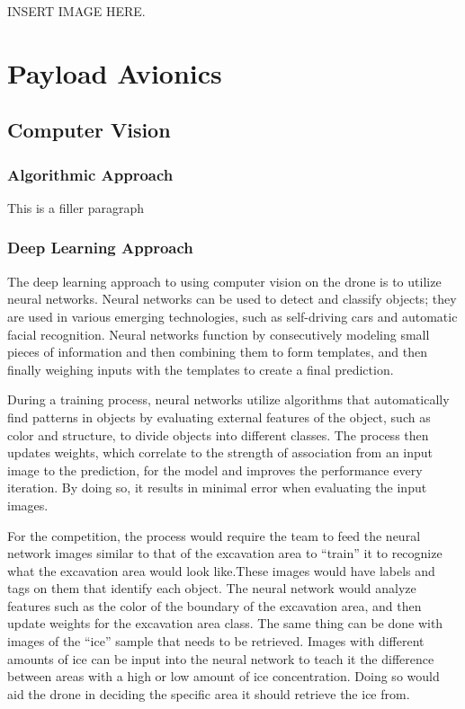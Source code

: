 			INSERT IMAGE HERE.

\section{Payload Avionics}\label{PL:Tradeoffs:Avionics}
	\subsection{Computer Vision}
		\subsubsection{Algorithmic Approach}
			This is a filler paragraph

		\subsubsection{Deep Learning Approach}
			The deep learning approach to using computer vision on the drone is to utilize neural networks. Neural networks can be used to detect and classify objects; they are used in various emerging technologies, such as self-driving cars and automatic facial recognition. 
			Neural networks function by consecutively modeling small pieces of information and then combining them to form templates, and then finally weighing inputs with the templates to create a final prediction.
		
			During a training process, neural networks utilize algorithms that automatically find patterns in objects by evaluating external features of the object, such as color and structure, to divide objects into different classes. The process then updates weights, which correlate to the strength of association from an input image to the prediction, for the model and improves the performance every iteration. By doing so, it results in minimal error when evaluating the input images.
		
			For the competition, the process would require the team to feed the neural network images similar to that of the excavation area to “train” it to recognize what the excavation area would look like.These images would have labels and tags on them that identify each object. The neural network would analyze features such as the color of the boundary of the excavation area, and then update weights for the excavation area class. The same thing can be done with images of the “ice” sample that needs to be retrieved. Images with different amounts of ice can be input into the neural network to teach it the difference between areas with a high or low amount of ice concentration. Doing so would aid the drone in deciding the specific area it should retrieve the ice from.
		
